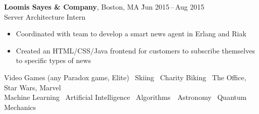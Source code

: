 \documentclass[11pt]{article}
\newcommand{\ressection}[1]{%
  \vspace{12pt}{\Large{\textsc{#1}}} \titlerule[0.5pt] \par
}
\begin{document}
\begin{tabbing}
  \textbf{Loomis Sayes \& Company}, Boston, MA \` Jun 2015\,--\,Aug 2015 \\
  Server Architecture Intern
\end{tabbing}
\begin{itemize}
  \item Coordinated with team to develop a smart news agent in Erlang and Riak
  \item Created an HTML/CSS/Java frontend for customers to subscribe themselves to specific types of news
\end{itemize}

\ressection{Interests}
\begin{center}
Video Games (any Paradox game, Elite) \textbullet\ Skiing \textbullet\ Charity Biking \textbullet\ The Office, Star Wars, Marvel \\
Machine Learning \textbullet\ Artificial Intelligence \textbullet\ Algorithms\ \textbullet\ Astronomy \textbullet\ Quantum Mechanics
\end{center}
\end{document}
